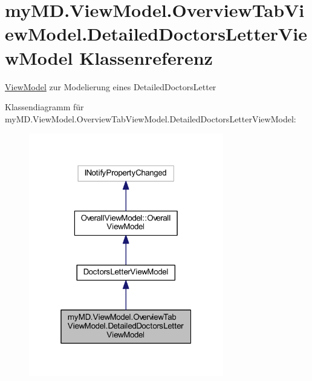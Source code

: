 \hypertarget{classmy_m_d_1_1_view_model_1_1_overview_tab_view_model_1_1_detailed_doctors_letter_view_model}{}\section{my\+M\+D.\+View\+Model.\+Overview\+Tab\+View\+Model.\+Detailed\+Doctors\+Letter\+View\+Model Klassenreferenz}
\label{classmy_m_d_1_1_view_model_1_1_overview_tab_view_model_1_1_detailed_doctors_letter_view_model}


\mbox{\hyperlink{namespacemy_m_d_1_1_view_model}{View\+Model}} zur Modelierung eines Detailed\+Doctors\+Letter  




Klassendiagramm für my\+M\+D.\+View\+Model.\+Overview\+Tab\+View\+Model.\+Detailed\+Doctors\+Letter\+View\+Model\+:
\nopagebreak
\begin{figure}[H]
\begin{center}
\leavevmode
\includegraphics[width=241pt]{classmy_m_d_1_1_view_model_1_1_overview_tab_view_model_1_1_detailed_doctors_letter_view_model__inherit__graph}
\end{center}
\end{figure}


